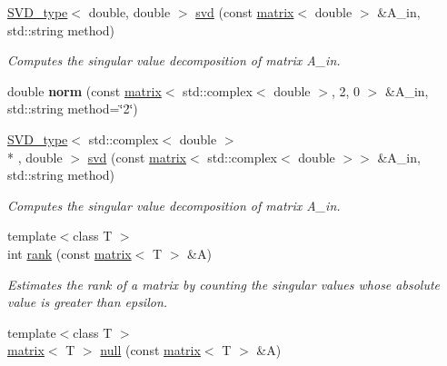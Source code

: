 \begin{DoxyCompactItemize}
\item 
\hypertarget{namespacekeycpp_a838fc93d66e1ab63d68d04781086d81a}{\hyperlink{classkeycpp_1_1_s_v_d__type}{S\-V\-D\-\_\-type}$<$ double, double $>$ \hyperlink{namespacekeycpp_a838fc93d66e1ab63d68d04781086d81a}{svd} (const \hyperlink{classkeycpp_1_1matrix}{matrix}$<$ double $>$ \&A\-\_\-in, std\-::string method)}\label{namespacekeycpp_a838fc93d66e1ab63d68d04781086d81a}

\begin{DoxyCompactList}\small\item\em Computes the singular value decomposition of matrix A\-\_\-in. \end{DoxyCompactList}\item 
\hypertarget{namespacekeycpp_a3d00bd96e42ccdc9faabc117b829f325}{double {\bfseries norm} (const \hyperlink{classkeycpp_1_1matrix}{matrix}$<$ std\-::complex$<$ double $>$, 2, 0 $>$ \&A\-\_\-in, std\-::string method=\char`\"{}2\char`\"{})}\label{namespacekeycpp_a3d00bd96e42ccdc9faabc117b829f325}

\item 
\hypertarget{namespacekeycpp_ad610adca37ac4c85df23b899d29d5dfc}{\hyperlink{classkeycpp_1_1_s_v_d__type}{S\-V\-D\-\_\-type}$<$ std\-::complex$<$ double $>$\\*
, double $>$ \hyperlink{namespacekeycpp_ad610adca37ac4c85df23b899d29d5dfc}{svd} (const \hyperlink{classkeycpp_1_1matrix}{matrix}$<$ std\-::complex$<$ double $>$$>$ \&A\-\_\-in, std\-::string method)}\label{namespacekeycpp_ad610adca37ac4c85df23b899d29d5dfc}

\begin{DoxyCompactList}\small\item\em Computes the singular value decomposition of matrix A\-\_\-in. \end{DoxyCompactList}\item 
\hypertarget{namespacekeycpp_aeb9efbc77cc58fa22403ea7ae5f4555c}{{\footnotesize template$<$class T $>$ }\\int \hyperlink{namespacekeycpp_aeb9efbc77cc58fa22403ea7ae5f4555c}{rank} (const \hyperlink{classkeycpp_1_1matrix}{matrix}$<$ T $>$ \&A)}\label{namespacekeycpp_aeb9efbc77cc58fa22403ea7ae5f4555c}

\begin{DoxyCompactList}\small\item\em Estimates the rank of a matrix by counting the singular values whose absolute value is greater than epsilon. \end{DoxyCompactList}\item 
\hypertarget{namespacekeycpp_a8f497e2da901adba0e1257be943595a1}{{\footnotesize template$<$class T $>$ }\\\hyperlink{classkeycpp_1_1matrix}{matrix}$<$ T $>$ \hyperlink{namespacekeycpp_a8f497e2da901adba0e1257be943595a1}{null} (const \hyperlink{classkeycpp_1_1matrix}{matrix}$<$ T $>$ \&A)}\label{namespacekeycpp_a8f497e2da901adba0e1257be943595a1}


\end{DoxyCompactItemize}
